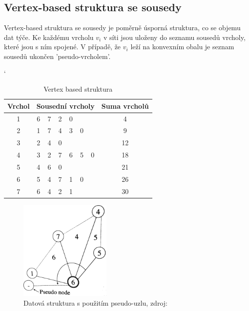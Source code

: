 \documentclass[12pt,a4paper]{article}
\begin{document}
\subsection{Vertex-based struktura se sousedy}

Vertex-based struktura se sousedy je poměrně úsporná struktura, co se
objemu dat týče. Ke každému vrcholu $v_i$ v síti jsou uloženy do
seznamu sousedů vrcholy, které jsou s ním spojené. V případě, že $v_i$
leží na konvexním obalu je seznam sousedů ukončen 'pseudo-vrcholem'.

\begin{table}[h]
\catcode`
\begin{tabular}{|c||c|c|c|c|c|c||c|}
\hline
Vrchol & \multicolumn{6}{|c|}{Sousední vrcholy} & Suma vrcholů \\ \hline \hline
1      & 6    & 7    & 2    & 0    &     &     & 4            \\ \hline
2      & 1    & 7    & 4    & 3    & 0   &     & 9            \\ \hline
3      & 2    & 4    & 0    &      &     &     & 12           \\ \hline
4      & 3    & 2    & 7    & 6    & 5   & 0   & 18           \\ \hline
5      & 4    & 6    & 0    &      &     &     & 21           \\ \hline
6      & 5    & 4    & 7    & 1    & 0   &     & 26           \\ \hline
7      & 6    & 4    & 2    & 1    &     &     & 30           \\ \hline
\end{tabular}
\caption{Vertex based struktura}
\label{tab:vertex_based}
\end{table}

\begin{figure}[h!]
\centering
\includegraphics[width=0.4\textwidth]{img/pseudo_node.png}
\caption{Datová struktura s použitím pseudo-uzlu, zdroj: \cite{triangulation}}
\label{fig:pseudo_node}
\end{figure}
\end{document}
